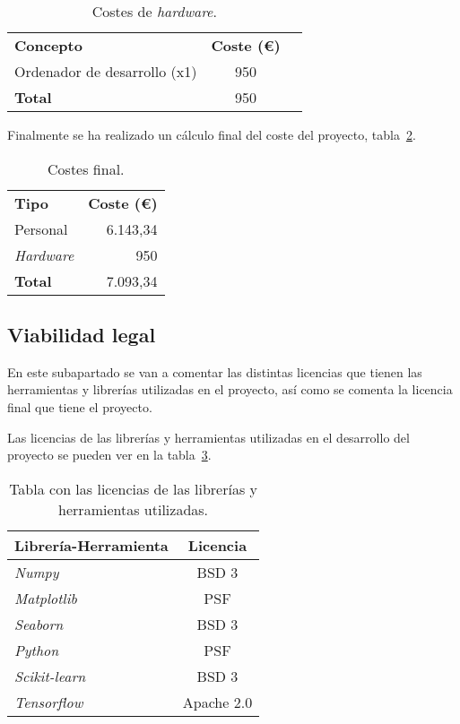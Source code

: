\begin{table}
	\centering
	\begin{tabular}[]{@{}l c r@{}}
		\toprule
		\textbf{Concepto} & \textbf{Coste (\euro{})} \\
		\otoprule
		Ordenador de desarrollo (x1) & 950 \\\hubu
		\textbf{Total} & 950 \\
		\bottomrule
	\end{tabular}
	\caption{Costes de \textit{hardware}.}
	\label{tab:costes_hardware}
\end{table}

Finalmente se ha realizado un cálculo final del coste del proyecto, tabla~\ref{tab:coste_final}.

\begin{table}
	\centering
	\begin{tabular}[]{@{}l r@{}}
		\toprule
		\textbf{Tipo} & \textbf{Coste (\euro{})}\\
		\otoprule
		Personal  & 6.143,34 \\
		\textit{Hardware}& 950 \\\hubu
		\textbf{Total}&7.093,34\\
		\bottomrule
	\end{tabular}
	\caption{Costes final.}
	\label{tab:coste_final}
\end{table}

\subsection{Viabilidad legal}
En este subapartado se van a comentar las distintas licencias que tienen las herramientas y librerías utilizadas en el proyecto, así como se comenta la licencia final que tiene el proyecto.

Las licencias de las librerías y herramientas utilizadas en el desarrollo del proyecto se pueden ver en la tabla~\ref{tab:lic}.

\begin{table}[h]
	\centering
	\begin{tabular}{lc}
		\toprule
		\textbf{Librería-Herramienta}&\textbf{Licencia}\\
		\midrule
		\textit{Numpy} & BSD 3\\
		\textit{Matplotlib} &  PSF\\
		\textit{Seaborn} & BSD 3\\
		\textit{Python} & PSF\\
		\textit{Scikit-learn} & BSD 3\\
		\textit{Tensorflow} & Apache 2.0\\
		\bottomrule
	\end{tabular}
	\caption{Tabla con las licencias de las librerías y herramientas utilizadas.}
	\label{tab:lic}
\end{table}

